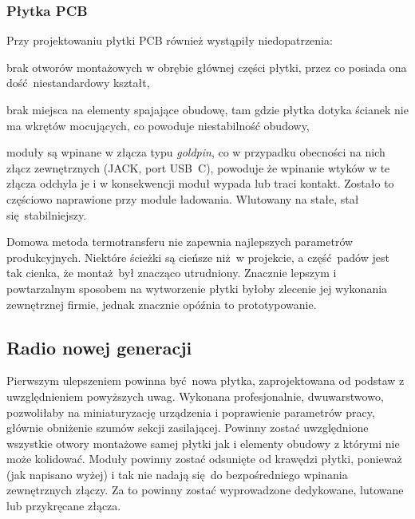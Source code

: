 \documentclass[polish]{aghengthesis}
\let\tempone\itemize
\let\temptwo\enditemize
\renewenvironment{itemize}{\tempone\setlength{\itemsep}{0cm}}{\temptwo}
\begin{document}
			\subsubsection{Płytka PCB}
				Przy projektowaniu płytki PCB również wystąpiły niedopatrzenia:
				\begin{itemize}
					\item brak otworów montażowych w obrębie głównej części płytki, przez co posiada ona dość niestandardowy kształt,
					\item brak miejsca na elementy spajające obudowę, tam gdzie płytka dotyka ścianek nie ma wkrętów mocujących, co powoduje niestabilność obudowy,
					\item moduły są wpinane w złącza typu \textit{goldpin}, co w przypadku obecności na nich złącz zewnętrznych (JACK, port USB~C), powoduje że wpinanie wtyków w te złącza odchyla je i w konsekwencji moduł wypada lub traci kontakt. Zostało to częściowo naprawione przy module ładowania. Wlutowany na stałe, stał się stabilniejszy.
				\end{itemize}
				
				Domowa metoda termotransferu nie zapewnia najlepszych parametrów produkcyjnych. Niektóre ścieżki są cieńsze niż w projekcie, a część padów jest tak cienka, że montaż był znacząco utrudniony. Znacznie lepszym i powtarzalnym sposobem na wytworzenie płytki byłoby zlecenie jej wykonania zewnętrznej firmie, jednak znacznie opóźnia to prototypowanie.
		
		\subsection{Radio nowej generacji}
			Pierwszym ulepszeniem powinna być nowa płytka, zaprojektowana od podstaw z uwzględnieniem powyższych uwag. Wykonana profesjonalnie, dwuwarstwowo, pozwoliłaby na miniaturyzację urządzenia i poprawienie parametrów pracy, głównie obniżenie szumów sekcji zasilającej. Powinny zostać uwzględnione wszystkie otwory montażowe samej płytki jak i elementy obudowy z którymi nie może kolidować. Moduły powinny zostać odsunięte od krawędzi płytki, ponieważ (jak napisano wyżej) i tak nie nadają się do bezpośredniego wpinania zewnętrznych złączy. Za to powinny zostać wyprowadzone dedykowane, lutowane lub przykręcane złącza.
			$ $\\
\end{document}
